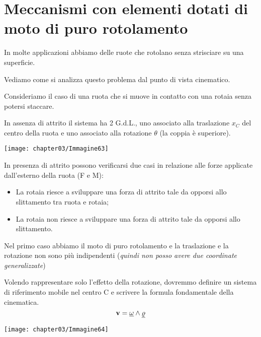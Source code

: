 		
	\section{Meccanismi con elementi dotati di moto di puro rotolamento}
	
	\begin{minipage}{.5\textwidth}
	In molte applicazioni abbiamo delle ruote che rotolano senza strisciare su una superficie.\newline
	
	Vediamo come si analizza questo problema dal punto di vista cinematico.
	
	 Consideriamo il caso di una  ruota che si muove in contatto con una rotaia senza potersi staccare.\newline
	
	In assenza di attrito il sistema ha 2 G.d.L., uno associato alla traslazione $x_C$ del centro della ruota e uno associato alla rotazione $\theta$ (la coppia è superiore).
	\end{minipage}
	\hfill
	\begin{minipage}{.5\textwidth}
	\centering
	\texttt{[image: chapter03/Immagine63]}
	\end{minipage}
	
	In presenza di attrito possono verificarsi due casi in relazione alle forze applicate dall'esterno della ruota (F e M):
	\begin{itemize}
		\item La rotaia riesce a sviluppare una forza di attrito tale da opporsi allo slittamento tra ruota e rotaia;
		\item La rotaia non riesce a sviluppare una forza di attrito tale da opporsi allo slittamento.
	\end{itemize}
		
		Nel primo caso abbiamo il moto di puro rotolamento e la traslazione e la rotazione non sono più indipendenti (\emph{quindi non posso avere due coordinate generalizzate})
		
		\begin{minipage}{.7\textwidth}
	Volendo rappresentare  solo l'effetto della rotazione, dovremmo definire un sistema di riferimento mobile nel centro C e scrivere la formula fondamentale della cinematica.\newline
	\[
	\mathbf{v} = \underline{\omega}\wedge \underline{\varrho}
	\]
		\end{minipage}
		\hfill
		\begin{minipage}{.3\textwidth}
		\centering
		\texttt{[image: chapter03/Immagine64]}
		\end{minipage}
		

